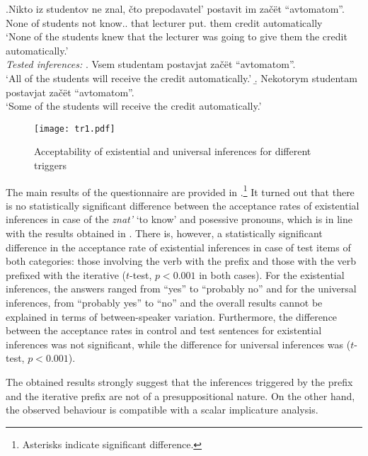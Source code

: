 \exg.\label{ex:znat}Nikto iz studentov ne znal, \v{c}to prepodavatel' postavit im za\v{c}\"{e}t ``avtomatom''.\\
None of students not know.. that lecturer put. them credit automatically\\
\trans `None of the students knew that the lecturer was going to give them the credit automatically.'\smallskip\\
\textit{Tested inferences:}
\a. Vsem studentam postavjat za\v{c}\"et ``avtomatom''.\\
 `All of the students will receive the credit automatically.'
\b. Nekotorym studentam postavjat za\v{c}\"et ``avtomatom''.\\
 `Some of the students will receive the credit automatically.'

\begin{figure}
\texttt{[image: tr1.pdf]}
\caption{Acceptability of existential and universal inferences for different triggers}
\label{fig:results}
\end{figure}

The main results of the questionnaire are provided in .\footnote{Asterisks indicate significant difference.} It turned out that there is no statistically significant difference between the acceptance rates of  existential inferences in case of the  \textit{znat'} `to know' and posessive pronouns, which is in line with the results obtained in \citealt{Chemla:09}. There is, however, a statistically significant difference in the acceptance rate of  existential inferences in case of test items of both categories: those involving the verb with the  prefix  and those with the verb prefixed with the iterative  ($t$-test, $p<0.001$ in both cases). For the existential inferences, the answers ranged from ``yes'' to ``probably no'' and for the universal inferences, from ``probably yes'' to ``no'' and the overall results cannot be explained in terms of between-speaker variation. Furthermore, the difference between the acceptance rates in control and
test sentences for existential inferences was not significant, while the
difference for universal inferences was ($t$-test, $p<0.001$).

The obtained results strongly suggest that the inferences triggered by the  prefix  and the iterative prefix  are not of a presuppositional nature. On the other hand, the observed behaviour is compatible with a scalar implicature analysis.

